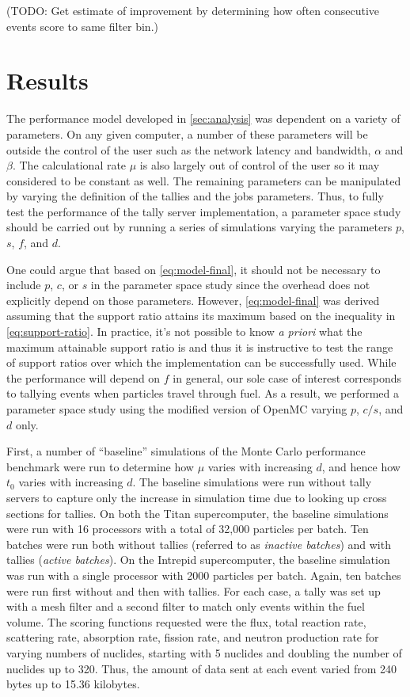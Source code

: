 \documentclass[3p]{elsarticle}
\begin{document}
(TODO: Get estimate of improvement by determining how often consecutive events
score to same filter bin.)

\section{Results}
\label{sec:results}

The performance model developed in \autoref{sec:analysis} was dependent on a
variety of parameters. On any given computer, a number of these parameters will
be outside the control of the user such as the network latency and bandwidth,
$\alpha$ and $\beta$. The calculational rate $\mu$ is also largely out of
control of the user so it may considered to be constant as well. The remaining
parameters can be manipulated by varying the definition of the tallies and the
jobs parameters. Thus, to fully test the performance of the tally server
implementation, a parameter space study should be carried out by running a
series of simulations varying the parameters $p$, $s$, $f$, and $d$.

One could argue that based on \eqref{eq:model-final}, it should not be necessary
to include $p$, $c$, or $s$ in the parameter space study since the overhead does
not explicitly depend on those parameters. However, \eqref{eq:model-final} was
derived assuming that the support ratio attains its maximum based on the
inequality in \eqref{eq:support-ratio}. In practice, it's not possible to know
{\em a priori} what the maximum attainable support ratio is and thus it is
instructive to test the range of support ratios over which the implementation
can be successfully used. While the performance will depend on $f$ in general,
our sole case of interest corresponds to tallying events when particles travel
through fuel. As a result, we performed a parameter space study using the
modified version of OpenMC varying $p$, $c/s$, and $d$ only.

First, a number of ``baseline'' simulations of the Monte Carlo performance
benchmark were run to determine how $\mu$ varies with increasing $d$, and hence
how $t_0$ varies with increasing $d$. The baseline simulations were run without
tally servers to capture only the increase in simulation time due to looking up
cross sections for tallies. On both the Titan supercomputer, the baseline
simulations were run with 16 processors with a total of 32,000 particles per
batch. Ten batches were run both without tallies (referred to as {\em inactive
  batches}) and with tallies ({\em active batches}). On the Intrepid
supercomputer, the baseline simulation was run with a single processor with 2000
particles per batch. Again, ten batches were run first without and then with
tallies. For each case, a tally was set up with a mesh filter and a second
filter to match only events within the fuel volume. The scoring functions
requested were the flux, total reaction rate, scattering rate, absorption rate,
fission rate, and neutron production rate for varying numbers of nuclides,
starting with 5 nuclides and doubling the number of nuclides up to 320. Thus,
the amount of data sent at each event varied from 240 bytes up to 15.36
kilobytes.
\end{document}
